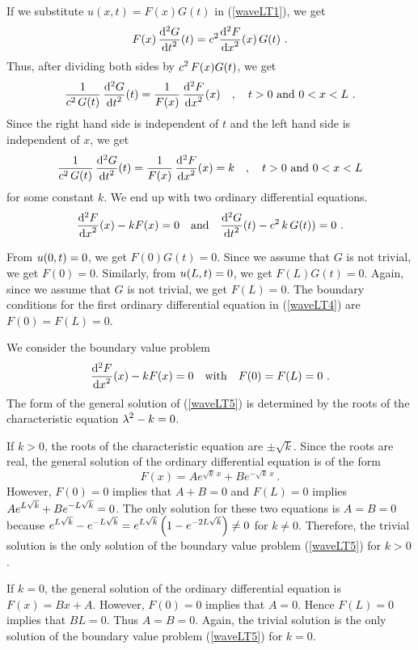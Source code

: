 If we substitute $u(x,t) = F(x)G(t)$ in (\ref{waveLT1}), we get
\[
F(x)\,\displaystyle \frac{\mathrm{d}^{2}{G}} {\displaystyle \mathrm{d}{t}^{2}}(t) = c^2 \displaystyle \frac{\mathrm{d}^{2}{F}} {\displaystyle \mathrm{d}{x}^{2}}(x)\, G(t) \ .
\]
Thus, after dividing both sides by $\displaystyle c^2\,F(x)G(t)$, we get
\[
\frac{1}{c^2\,G(t)} \, \displaystyle \frac{\mathrm{d}^{2}{G}} {\displaystyle \mathrm{d}{t}^{2}}(t) =
\frac{1}{F(x)}\, \displaystyle \frac{\mathrm{d}^{2}{F}} {\displaystyle \mathrm{d}{x}^{2}}(x)
\quad , \quad t>0 \ \text{and} \ 0<x<L \ .
\]
Since the right hand side is independent of $t$ and the left hand side
is independent of $x$, we get
\[
\frac{1}{c^2\,G(t)} \, \dydxn{G}{t}{2}(t) = \frac{1}{F(x)}\,
\dydxn{F}{x}{2}(x) = k \quad , \quad t>0 \ \text{and} \ 0<x<L
\]
for some constant $k$.  We end up with two ordinary differential equations.
\begin{equation} \label{waveLT4}
\displaystyle \frac{\mathrm{d}^{2}{F}} {\displaystyle \mathrm{d}{x}^{2}}(x) -k F(x) = 0 \quad \text{and}
\quad \displaystyle \frac{\mathrm{d}^{2}{G}} {\displaystyle \mathrm{d}{t}^{2}}(t) - c^2\,k\,G(t)) = 0 \ .
\end{equation}

From $\displaystyle u(0,t) = 0$, we get
$F(0)G(t)=0$.  Since we assume that $G$ is not trivial, we get
$F(0)=0$.  Similarly, from $\displaystyle u(L,t) = 0$, we
get $F(L)G(t)=0$.  Again, since we assume that $G$ is not trivial, we
get $F(L)=0$.  The boundary conditions for 
the first ordinary differential equation in (\ref{waveLT4}) are
$F(0)=F(L)=0$.

We consider the boundary value problem
\begin{equation} \label{waveLT5}
\dydxn{F}{x}{2}(x) -k F(x) = 0 \quad \text{with} \quad F(0)=F(L)=0  \ .
\end{equation}
The form of the general solution of (\ref{waveLT5}) is determined by the
roots of the characteristic equation $\displaystyle \lambda^2-k=0$.

If $k>0$, the roots of the characteristic equation are $\pm \sqrt{k}$.
Since the roots are real, the general solution of the ordinary differential
equation is of the form
\[
F(x) = A e^{\sqrt{k}\,x} + B e^{-\sqrt{k}\,x} \ .
\]
However, $F(0)=0$ implies that $A + B = 0$ and $F(L)=0$ implies
$\displaystyle A e^{L\sqrt{k}} + B e^{-L\sqrt{k}} = 0$.
The only solution for these two equations is $A=B=0$ because
$\displaystyle e^{L\sqrt{k}} - e^{-L\sqrt{k}}
= e^{L\sqrt{k}}\left(1-e^{-2L\sqrt{k}}\right) \neq 0$ for $k\neq 0$.
Therefore, the trivial solution is the only solution
of the boundary value problem (\ref{waveLT5}) for $k>0$.

If $k=0$, the general solution of the ordinary differential equation
is $F(x)=B x+ A$.  However, $F(0)=0$ implies that $A=0$.  Hence $F(L)=0$
implies that $B L = 0$.  Thus $A = B = 0$.  Again, the trivial
solution is the only solution of the boundary value problem
(\ref{waveLT5}) for $k =0$.

